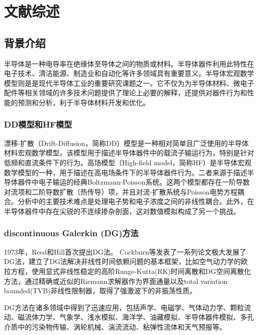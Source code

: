 \cleardoublepage
\newrefsection
\chapter{文献综述}

\section{背景介绍}
半导体是一种电导率在绝缘体至导体之间的物质或材料。半导体器件利用此特性在电子技术、清洁能源、制造业和自动化等许多领域具有重要意义。半导体宏观数学模型则是是现代半导体工业的重要研究课题之一。它不仅为为半导体材料、微电子配件等相关领域的许多技术问题提供了理论上必要的解释，还提供对器件行为和性能的预测和分析，利于半导体材料开发和优化。
\subsection{DD模型\cite{cercignani2000device}和HF模型\cite{cercignani2000device}}
漂移-扩散（Drift-Diffusion，简称DD）模型是一种相对简单且广泛使用的半导体材料宏观数学模型。该模型用于描述半导体器件中的载流子输运行为，特别是针对低频和直流条件下的行为。高场模型（High-field model，简称HF）是半导体宏观数学模型的一种，用于描述在高电场条件下的半导体器件行为。二者来源于描述半导体器件中电子输运的经典Boltzmann-Poisson系统。这两个模型都存在一阶导数对流项和二阶导数扩散（热传导）项，并且对流-扩散系统与Poisson电势方程耦合\cite{cercignani2000device}。分析中的主要技术难点是处理电子势和电子浓度之间的非线性耦合。此外，在半导体器件中存在尖锐的不连续掺杂剖面，这对数值模拟构成了另一个挑战。

\subsection{discontinuous Galerkin (DG)方法}
1973年，Reed和Hill首次提出DG法\cite{reed1973triangular}。
Cockburn等发表了一系列论文极大发展了DG法，建立了DG法解决非线性时间依赖问题的基本框架\cite{reed1973triangular,cockburn1991runge,cockburn1989tvb2,cockburn1989tvb3,cockburn1990runge,cockburn1998runge}，比如空气动力学的欧拉方程，使用显式非线性稳定的高阶Runge-Kutta(RK)时间离散和DG空间离散化方法，通过精确或近似的Riemann求解器作为界面通量以及total variation bounded(TVB)非线性限制器，取得了强激波下的非振荡性质。

DG方法在诸多领域中得到了迅速应用，包括声学、电磁学、气体动力学、颗粒流动、磁流体力学、气象学、浅水模拟、海洋学、油藏模拟、半导体器件模拟、多孔介质中的污染物传输、涡轮机械、湍流流动、粘弹性流体和天气预报等\cite{cockburn2000development}。

